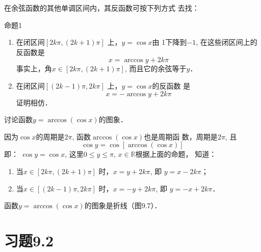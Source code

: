 在余弦函数的其他单调区间内，其反函数可按下列方式
去找：

\begin{blk}{命题1}
\begin{enumerate}
    \item 在闭区间$[2k\pi ,(2k+1)\pi]$ 上，$y=\cos x$由
    1下降到$-1$, 在这些闭区间上的反函数是
 \[   x=\arccos y+2k\pi \]
    事实上，角$x\in [2k\pi ,(2k+1)\pi]$, 而且它的余弦等于$y$．
    \item 在闭区间$[(2k-1)\pi ,2k\pi]$ 上，$y=\cos x$的反函数
    是
\[    x=-\arccos y+2k\pi \]
    证明相仿．
\end{enumerate}
\end{blk}

\begin{example}
    讨论函数$y=\arccos(\cos x)$的图象．
\end{example}

\begin{solution}
因为$\cos x$的周期是$2\pi$, 函数$\arccos(\cos x)$也是周期函
数，周期是$2\pi$, 且
\[\cos y=\cos[\arccos(\cos x)]\]
即：
$\cos y=\cos x$, 这里$0\le y\le \pi$, $x\in\mathbb{R}$根据上面的命题，
知道：
\begin{enumerate}
    \item 当$x\in[2k\pi ,(2k+1)\pi]$ 时，$x=y+2k\pi$, 即
$y=x-2k\pi$；
\item  当$x\in[(2k-1)\pi ,2k\pi]$ 时，$x=-y+2k\pi$, 即
$y=-x+2k\pi$．
\end{enumerate}
函数$y=\arccos(\cos x)$的图象是折线（图9.7）．

\begin{figure}[htp]
    \centering
{}    
    \caption{}
\end{figure}
\end{solution}


\section*{习题9.2}

